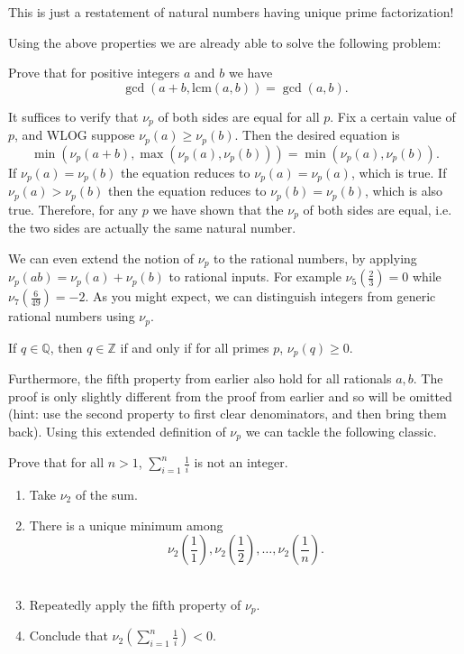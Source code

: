 \documentclass[mast]{lucky}
\begin{document}
\begin{pro}
    This is just a restatement of natural numbers having unique prime factorization!
\end{pro}

Using the above properties we are already able to solve the following problem:

\begin{exam}
    Prove that for positive integers $a$ and $b$ we have \[\gcd(a+b,\text{lcm}(a,b))=\gcd(a,b).\]
\end{exam}

\begin{sol}
    It suffices to verify that $\nu_p$ of both sides are equal for all $p$. Fix a certain value of $p$, and WLOG suppose $\nu_p(a) \geq \nu_p(b)$. Then the desired equation is \[\min(\nu_p(a+b), \max(\nu_p(a), \nu_p(b))) = \min(\nu_p(a), \nu_p(b)).\] If $\nu_p(a) = \nu_p(b)$ the equation reduces to $\nu_p(a) = \nu_p(a)$, which is true. If $\nu_p(a) > \nu_p(b)$ then the equation reduces to $\nu_p(b)=\nu_p(b)$, which is also true. Therefore, for any $p$ we have shown that the $\nu_p$ of both sides are equal, i.e. the two sides are actually the same natural number.
\end{sol}

\bigskip
We can even extend the notion of $\nu_p$ to the rational numbers, by applying $\nu_p(ab)=\nu_p(a)+\nu_p(b)$ to rational inputs. For example $\nu_5\left( \frac23 \right)=0$ while $\nu_7\left( \frac6{49} \right)=-2$. As you might expect, we can distinguish integers from generic rational numbers using $\nu_p$.

\begin{fact}
    If $q\in\mathbb Q$, then $q\in\mathbb Z$ if and only if for all primes $p$, $\nu_p(q)\geq 0$.
\end{fact}

Furthermore, the fifth property from earlier also hold for all rationals $a,b$. The proof is only slightly different from the proof from earlier and so will be omitted (hint: use the second property to first clear denominators, and then bring them back). Using this extended definition of $\nu_p$ we can tackle the following classic.

\begin{exam}[Classic]
    Prove that for all $n>1$, $\sum_{i=1}^n\frac1i$ is not an integer.
\end{exam}

\begin{walk}
    \begin{enumerate}
        \item Take $\nu_2$ of the sum.
        \item There is a unique minimum among \[\nu_2\left( \frac11 \right),\nu_2\left( \frac12 \right),\dots,\nu_2\left( \frac1n \right).\]\
        \item Repeatedly apply the fifth property of $\nu_p$.
        \item Conclude that $\nu_2\left( \sum_{i=1}^n\frac1i \right)<0$.
    \end{enumerate}
\end{walk}
\end{document}
